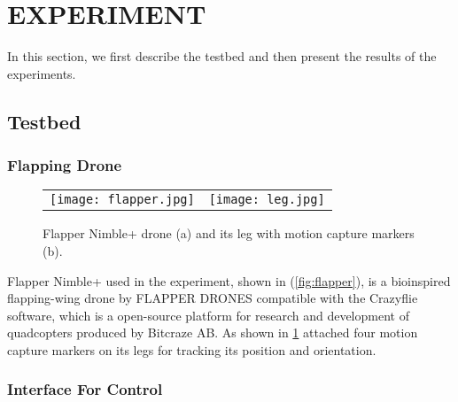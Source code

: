 \section{EXPERIMENT}
In this section, we first describe the testbed and then present the results of the experiments.

\subsection{Testbed}

\subsubsection{Flapping Drone}

\begin{figure}
    \centering
    \begin{tabular}{cc}
        \begin{minipage}[h]{0.4 \columnwidth}
          \centering
          \texttt{[image: flapper.jpg]}
          \subcaption{}
          \label{fig:flapper}
        \end{minipage} &
        \begin{minipage}[h]{0.4 \columnwidth}
          \centering
          \texttt{[image: leg.jpg]}
          \subcaption{}
          \label{fig:leg}
        \end{minipage}
      \end{tabular}
    \caption{Flapper Nimble+ drone (a) and its leg with motion capture markers (b).}
\end{figure}

Flapper Nimble+ used in the experiment, shown in (\ref{fig:flapper}), is a bioinspired flapping-wing drone by FLAPPER DRONES compatible with the Crazyflie software, 
which is a open-source platform for research and development of quadcopters produced by Bitcraze AB. 
As shown in \ref{fig:leg} attached four motion capture markers on its legs for tracking its position and orientation. 

\subsubsection{Interface For Control}

